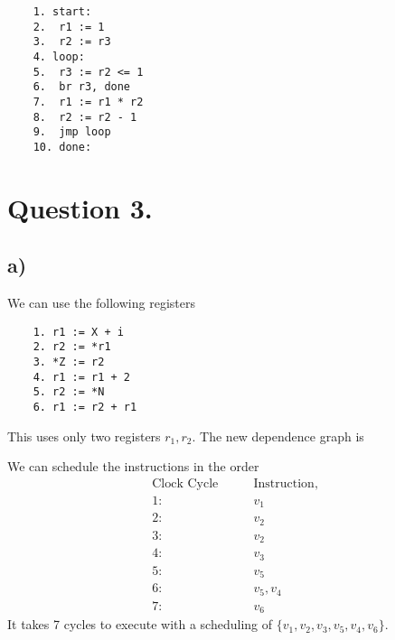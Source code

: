 \documentclass{article}
\begin{document}
\begin{verbatim}
    1. start:
    2.  r1 := 1
    3.  r2 := r3
    4. loop:
    5.  r3 := r2 <= 1
    6.  br r3, done
    7.  r1 := r1 * r2
    8.  r2 := r2 - 1
    9.  jmp loop
    10. done:
\end{verbatim}

\section*{Question 3.}
\subsection*{a)}
We can use the following registers

\begin{verbatim}
    1. r1 := X + i
    2. r2 := *r1
    3. *Z := r2
    4. r1 := r1 + 2
    5. r2 := *N
    6. r1 := r2 + r1
\end{verbatim}

This uses only two registers $r_1, r_2$. The new dependence graph is


We can schedule the instructions in the order
\begin{align*}
    \text{Clock Cycle}\qquad & \text{Instruction}, \\
    1:\qquad                 & v_1                 \\
    2: \qquad                & v_2                 \\
    3: \qquad                & v_2                 \\
    4:  \qquad               & v_3                 \\
    5:  \qquad               & v_5                 \\
    6:  \qquad               & v_5, v_4            \\
    7:   \qquad              & v_6
\end{align*}
It takes 7 cycles to execute with a scheduling of $\{v_1, v_2, v_3, v_5, v_4, v_6\}$.
\end{document}

